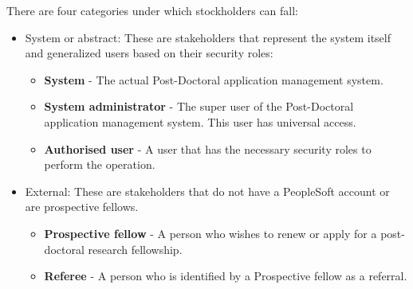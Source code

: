 \documentclass[12pt]{article}
\begin{document}
There are four categories under which stockholders can fall:
\begin{itemize}	
\item System or abstract:
These are stakeholders that represent the system itself and generalized users based on their security roles:
\begin{itemize}
\item \textbf{System} - The actual Post-Doctoral application management system.
\item \textbf{System administrator} - The super user of the Post-Doctoral application management system. This user has universal access.
\item \textbf{Authorised user} - A user that has the necessary security roles to perform the operation.
\end{itemize}
\item External:
These are stakeholders that do not have a PeopleSoft account or are prospective fellows.
\begin{itemize}	
\item \textbf{Prospective fellow} - A person who wishes to renew or apply for a post-doctoral research fellowship.
\item \textbf{Referee} - A person who is identified by a Prospective fellow as a referral.
\end{itemize}


\end{itemize}
\end{document}
